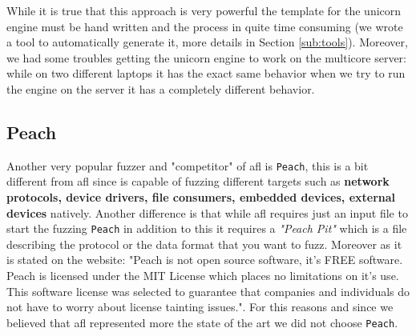 \documentclass[../main.tex]{subfiles}
\begin{document}
While it is true that this approach is very powerful the template for the
unicorn engine must be hand written and the process in quite time consuming (we
wrote a tool to automatically generate it, more details in Section
\ref{sub:tools}). Moreover, we had some troubles getting the unicorn engine to
work on the multicore server: while on two different laptops it has the exact
same behavior when we try to run the engine on the server it has a completely
different behavior.

\subsection{Peach}

Another very popular fuzzer and "competitor" of afl is \texttt{Peach}, this is a
bit different from afl since is capable of fuzzing different targets such as
\textbf{network protocols, device drivers, file consumers, embedded devices,
external devices} natively. Another difference is that while afl requires just
an input file to start the fuzzing \texttt{Peach} in addition to this it
requires a \textit{"Peach Pit"} which is a file describing the protocol or the
data format that you want to fuzz\cite{peach}. Moreover as it is stated on the
website: "Peach is not open source software, it’s FREE software. Peach is
licensed under the MIT License which places no limitations on it’s use. This
software license was selected to guarantee that companies and individuals do not
have to worry about license tainting issues."\cite{peachlicense}. For this
reasons and since we believed that afl represented more the state of the art we
did not choose \texttt{Peach}.
\end{document}
